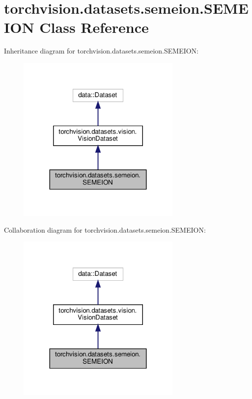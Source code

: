\hypertarget{classtorchvision_1_1datasets_1_1semeion_1_1SEMEION}{}\section{torchvision.\+datasets.\+semeion.\+S\+E\+M\+E\+I\+ON Class Reference}
\label{classtorchvision_1_1datasets_1_1semeion_1_1SEMEION}


Inheritance diagram for torchvision.\+datasets.\+semeion.\+S\+E\+M\+E\+I\+ON\+:
\nopagebreak
\begin{figure}[H]
\begin{center}
\leavevmode
\includegraphics[width=227pt]{classtorchvision_1_1datasets_1_1semeion_1_1SEMEION__inherit__graph}
\end{center}
\end{figure}


Collaboration diagram for torchvision.\+datasets.\+semeion.\+S\+E\+M\+E\+I\+ON\+:
\nopagebreak
\begin{figure}[H]
\begin{center}
\leavevmode
\includegraphics[width=227pt]{classtorchvision_1_1datasets_1_1semeion_1_1SEMEION__coll__graph}
\end{center}
\end{figure}
